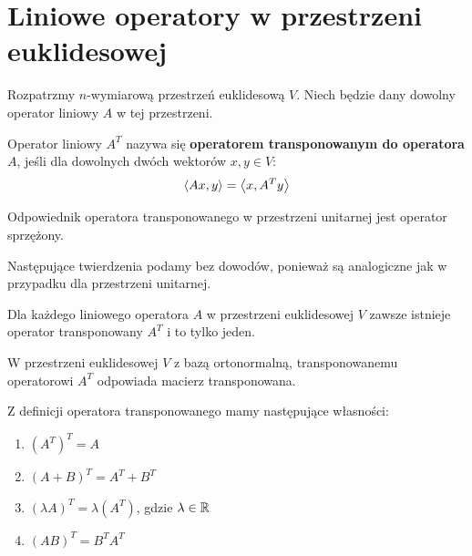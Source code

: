 \section{Liniowe operatory w przestrzeni euklidesowej}

Rozpatrzmy $n$-wymiarową przestrzeń euklidesową $V$. Niech będzie dany dowolny operator liniowy $A$ w tej przestrzeni.

\begin{definition}
    Operator liniowy $A^T$ nazywa się \textbf{operatorem transponowanym do operatora} $A$, jeśli dla dowolnych dwóch wektorów $x, y \in V$:
    \begin{equation}\label{eq:def_transposed_operator}
        \left\langle Ax, y \right\rangle = \left\langle x, A^Ty \right\rangle
    \end{equation}
\end{definition}
\begin{remark}
Odpowiednik operatora transponowanego w przestrzeni unitarnej jest operator sprzężony.
\end{remark}
Następujące twierdzenia podamy bez dowodów, ponieważ są analogiczne jak w przypadku dla przestrzeni unitarnej.

\begin{theorem}
Dla każdego liniowego operatora $A$ w przestrzeni euklidesowej $V$ zawsze istnieje operator transponowany $A^T$ i to tylko jeden.
\end{theorem}

\begin{theorem}
    W przestrzeni euklidesowej $V$ z bazą ortonormalną, transponowanemu operatorowi $A^T$ odpowiada macierz transponowana.
\end{theorem}

\begin{theorem}\label{theorem:properties_of_transposed_operator}
    Z definicji operatora transponowanego mamy następujące własności:
    \begin{enumerate}[leftmargin=1cm, itemsep=2pt, label=(\arabic*)]
        \item $(A^T)^T = A$
        \item $(A + B)^T = A^T + B^T$
        \item $(\lambda A)^T = \lambda(A^T)$, gdzie $\lambda \in \mathbb{R}$
        \item $(AB)^T = B^TA^T$
    \end{enumerate}
\end{theorem}


